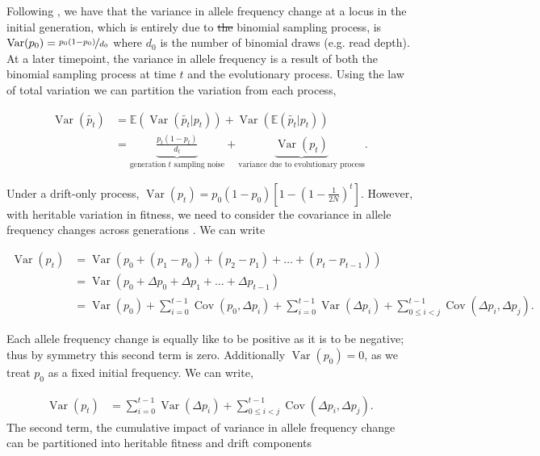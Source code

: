 \documentclass[11pt]{article}
\newcommand{\E}{\mathbb{E}}
\DeclareMathOperator{\var}{Var}
\DeclareMathOperator{\cov}{Cov}
\providecommand{\DIFaddtex}[1]{{\protect\color{blue}\uwave{#1}}} %
\providecommand{\DIFdeltex}[1]{{\protect\color{red}\sout{#1}}}                      %
\providecommand{\DIFaddbegin}{} %
\providecommand{\DIFaddend}{} %
\providecommand{\DIFdelbegin}{} %
\providecommand{\DIFdelend}{} %
\providecommand{\DIFadd}[1]{\texorpdfstring{\DIFaddtex{#1}}{#1}} %
\providecommand{\DIFdel}[1]{\texorpdfstring{\DIFdeltex{#1}}{}} %
\begin{document}
Following \textcite{Waples1989-sj}, we have that the variance in allele
frequency change at a locus in the initial generation, which is entirely due to
\DIFdelbegin \DIFdel{the }\DIFdelend \DIFaddbegin \DIFadd{a }\DIFaddend binomial sampling process, is $\var(p_0) = \nicefrac{p_0(1-p_0)}{d_0}$
where $d_0$ is the number of binomial draws (e.g. read depth). At a later
timepoint, the variance in allele frequency is a result of both the binomial
sampling process at time $t$ and the evolutionary process. Using the law of
total variation we can partition the variation from each process,

\begin{align}
  \var(\widetilde{p_t}) &= \E(\var(\widetilde{p_t} | p_t)) + \var(\E(\widetilde{p_t}|p_t)) \\
                        &= \underbrace{\frac{p_t(1-p_t)}{d_t}}_\text{generation $t$ sampling noise} + \underbrace{\var(p_t)}_\text{variance due to evolutionary process}.
\end{align}

Under a drift-only process, $\var(p_t) = p_0(1-p_0)\left[1- \left(1 -
\frac{1}{2N}\right)^t\right]$. However, with heritable variation in fitness, we
need to consider the covariance in allele frequency changes across generations
\parencite{Buffalo2019-io}. We can write

\begin{align}
  \var(p_t) &= \var\left(p_0 + (p_1 - p_0) + (p_2 - p_1) + \ldots + (p_t - p_{t-1}) \right) \\
         &= \var\left(p_0 + \Delta p_0 + \Delta p_1 + \ldots + \Delta p_{t-1} \right) \\
         &= \var(p_0) + \sum_{i=0}^{t-1} \cov(p_0, \Delta p_i) + \sum_{i=0}^{t-1} \var(\Delta p_i) + \sum_{0 \le i < j}^{t-1} \cov(\Delta p_i, \Delta p_j).
\end{align}
%

Each allele frequency change is equally like to be positive as it is to be
negative; thus by symmetry this second term is zero. Additionally $\var(p_0) = 0$,
as we treat $p_0$ as a fixed initial frequency. We can write, 

\begin{align}
  \var(p_t) &= \sum_{i=0}^{t-1} \var(\Delta p_i) + \sum_{0 \le i < j}^{t-1} \cov(\Delta p_i, \Delta p_j).
\end{align}
%
The second term, the cumulative impact of variance in allele frequency change
can be partitioned into heritable fitness and drift components
\parencite{Santiago1995-hx,Buffalo2019-io}
\end{document}
